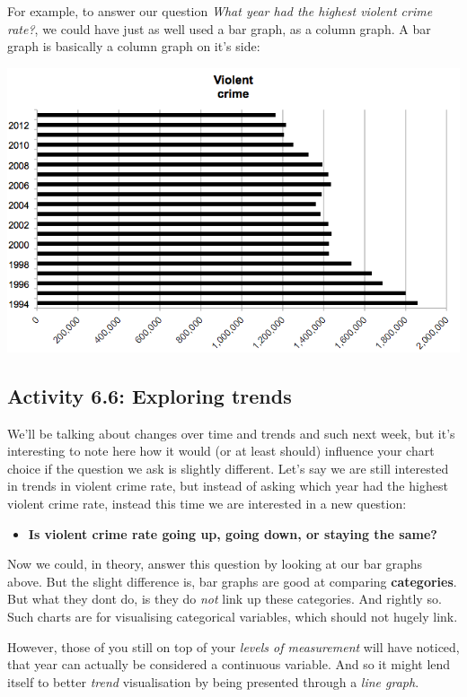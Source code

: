 \documentclass[
]{book}
\providecommand{\tightlist}{%
  \setlength{\itemsep}{0pt}\setlength{\parskip}{0pt}}
\begin{document}
For example, to answer our question \emph{What year had the highest violent crime rate?}, we could have just as well used a bar graph, as a column graph. A bar graph is basically a column graph on it's side:

\includegraphics{imgs/bar_same_col.png}

\hypertarget{activity-6.6-exploring-trends}{%
\subsection{Activity 6.6: Exploring trends}\label{activity-6.6-exploring-trends}}

We'll be talking about changes over time and trends and such next week, but it's interesting to note here how it would (or at least should) influence your chart choice if the question we ask is slightly different. Let's say we are still interested in trends in violent crime rate, but instead of asking which year had the highest violent crime rate, instead this time we are interested in a new question:

\begin{itemize}
\tightlist
\item
  \textbf{Is violent crime rate going up, going down, or staying the same?}
\end{itemize}

Now we could, in theory, answer this question by looking at our bar graphs above. But the slight difference is, bar graphs are good at comparing \textbf{categories}. But what they dont do, is they do \emph{not} link up these categories. And rightly so. Such charts are for visualising categorical variables, which should not hugely link.

However, those of you still on top of your \emph{levels of measurement} will have noticed, that year can actually be considered a continuous variable. And so it might lend itself to better \emph{trend} visualisation by being presented through a \emph{line graph}.
\end{document}
